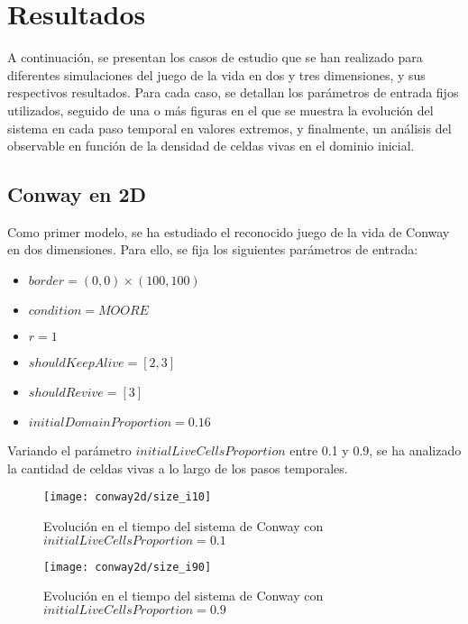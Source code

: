 \section{Resultados}\label{sec:resultados}
A continuación, se presentan los casos de estudio que se han realizado para diferentes simulaciones del juego
de la vida en dos y tres dimensiones, y sus respectivos resultados.
Para cada caso, se detallan los parámetros de entrada fijos utilizados, seguido de una o más figuras en el que
se muestra la evolución del sistema en cada paso temporal en valores extremos, y finalmente, un análisis del
observable en función de la densidad de celdas vivas en el dominio inicial.

\subsection{Conway en 2D}\label{subsec:conway-en-2d}

Como primer modelo, se ha estudiado el reconocido juego de la vida de Conway en dos dimensiones.
Para ello, se fija los siguientes parámetros de entrada:

\begin{itemize}
    \item $border = (0, 0) \times (100, 100)$
    \item $condition = MOORE$
    \item $r = 1$
    \item $shouldKeepAlive = [2, 3]$
    \item $shouldRevive = [3]$
    \item $initialDomainProportion = 0.16$
\end{itemize}
Variando el parámetro $initialLiveCellsProportion$ entre 0.1 y 0.9, se ha analizado la cantidad de celdas vivas
a lo largo de los pasos temporales.
\begin{figure}[H]
    \centering
    \texttt{[image: conway2d/size\_i10]}
    \caption{Evolución en el tiempo del sistema de Conway con $initialLiveCellsProportion = 0.1$}
    \label{fig:conway2d_i10}
\end{figure}
\begin{figure}[H]
    \centering
    \texttt{[image: conway2d/size\_i90]}
    \caption{Evolución en el tiempo del sistema de Conway con $initialLiveCellsProportion = 0.9$}
    \label{fig:conway2d_i90}
\end{figure}